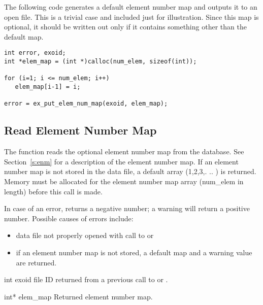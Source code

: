 The following code generates a default element number map and outputs
it to an open \exo{} file. This is a trivial case and included just
for illustration. Since this map is optional, it should be written out
only if it contains something other than the default map.

\begin{lstlisting}
int error, exoid;
int *elem_map = (int *)calloc(num_elem, sizeof(int));

for (i=1; i <= num_elem; i++)
   elem_map[i-1] = i;

error = ex_put_elem_num_map(exoid, elem_map);
\end{lstlisting}

\subsection{Read Element Number Map}

The function  reads the optional
element number map from the database. See Section~\ref{s:enm} for a
description of the element number map. If an element number map is not
stored in the data file, a default array (1,2,3,. .. ) is
returned. Memory must be allocated for the element number map array
({num_elem} in length) before this call is made.

In case of an error,  returns a
negative number; a warning will return a positive number.  Possible
causes of errors include:

\begin{itemize}
 \item data file not properly opened with call to 
 or 

 \item if an element number map is not stored, a default map and a
 warning value are returned.
\end{itemize}




\begin{parameters}
\item[{int exoid \R{}}]
\exo{} file ID returned from a previous call to  or
.

\item[{int* elem_map \W{}}]
Returned element number map.
\end{parameters}

